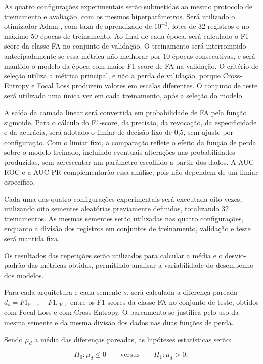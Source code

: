 \documentclass[
    12pt,                %
    openright,           %
    oneside,             %
    a4paper,             %
    english,             %
    brazil               %
]{abntex2}
\begin{document}
As quatro configurações experimentais serão submetidas
ao mesmo protocolo de treinamento e avaliação, com os
mesmos hiperparâmetros. Será utilizado o otimizador
Adam \cite{Kingma2015}, com taxa de aprendizado de
$10^{-3}$, lotes de 32 registros e no máximo 50 épocas
de treinamento. Ao final de cada época, será calculado
o F1-score da classe FA no conjunto de validação. O
treinamento será interrompido antecipadamente se essa
métrica não melhorar por 10 épocas consecutivas, e será
mantido o modelo da época com maior F1-score de FA na
validação. O critério de seleção utiliza a métrica
principal, e não a perda de validação, porque
Cross-Entropy e Focal Loss produzem valores em escalas
diferentes. O conjunto de teste será utilizado uma
única vez em cada treinamento, após a seleção do modelo.

A saída da camada linear será convertida em
probabilidade de FA pela função sigmoide. Para o
cálculo do F1-score, da precisão, da revocação, da
especificidade e da acurácia, será adotado o limiar
de decisão fixo de 0,5, sem ajuste por configuração.
Com o limiar fixo, a comparação reflete o efeito da
função de perda sobre o modelo treinado, incluindo
eventuais alterações nas probabilidades produzidas,
sem acrescentar um parâmetro escolhido a partir dos
dados. A AUC-ROC e a AUC-PR complementarão essa
análise, pois não dependem de um limiar específico.

Cada uma das quatro configurações experimentais será
executada oito vezes, utilizando oito sementes
aleatórias previamente definidas, totalizando
32 treinamentos. As mesmas sementes serão utilizadas
nas quatro configurações, enquanto a divisão dos
registros em conjuntos de treinamento, validação
e teste será mantida fixa.

Os resultados das repetições serão utilizados para
calcular a média e o desvio-padrão das métricas
obtidas, permitindo analisar a variabilidade do
desempenho dos modelos.

Para cada arquitetura e cada semente $s$, será
calculada a diferença pareada
$d_s = F1_{\mathrm{FL},s} - F1_{\mathrm{CE},s}$ entre
os F1-scores da classe FA no conjunto de teste,
obtidos com Focal Loss e com Cross-Entropy. O
pareamento se justifica pelo uso da mesma semente e
da mesma divisão dos dados nas duas funções de perda.

Sendo $\mu_d$ a média das diferenças pareadas,
as hipóteses estatísticas serão:

\begin{equation}
    H_0: \mu_d \leq 0
    \qquad \text{versus} \qquad
    H_1: \mu_d > 0,
    \label{eq:hipoteses}
\end{equation}
\end{document}
